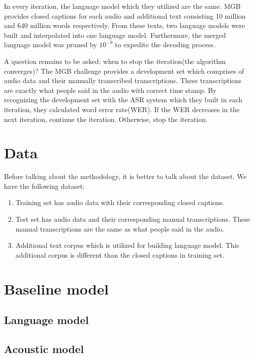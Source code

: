 In every iteration, the language model which they utilized are the same. MGB provides closed captions for each audio and additional text consisting 10 million and 640 million words respectively. From these texts, two language models were built and interpolated into one language model. Furthermore, the merged language model was pruned by $10^{-9}$ to expedite the decoding process.

A question remains to be asked: when to stop the iteration(the algorithm converges)? The MGB challenge provides a development set which comprises of audio data and their manually transcribed transcriptions. These transcriptions are exactly what people said in the audio with correct time stamp. By recognizing the development set with the ASR system which they built in each iteration, they calculated word error rate(WER). If the WER decreases in the next iteration, continue the iteration. Otherwise, stop the iteration.



\section{Data}
Before talking about the methodology, it is better to talk about the dataset. We have the following dataset:
\begin{enumerate}
\item Training set has audio data with their corresponding closed captions.
\item Test set has audio data and their corresponding manual transcriptions. These manual transcriptions are the same as what people said in the audio.
\item Additional text corpus which is utilized for building language model. This additional corpus is different than the closed captions in training set. 
\end{enumerate}




\section{Baseline model}

\subsection{Language model}

\subsection{Acoustic model}

